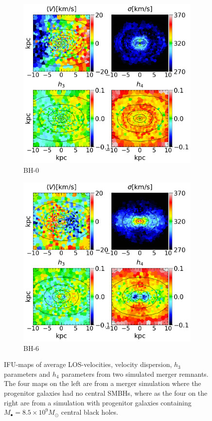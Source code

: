 \documentclass[english, oneside]{HYgradu}
\begin{document}
\begin{figure}
	\centering
	\begin{subfigure}[b]{0.49\textwidth}
		\includegraphics[width=\textwidth]{BH_0.png}
		\caption{BH-0}
	\end{subfigure}
	\begin{subfigure}[b]{0.49\textwidth}
		\includegraphics[width=\textwidth]{BH_6.png}
		\caption{BH-6}
	\end{subfigure}
	\caption{IFU-maps of average LOS-velocities, velocity dispersion, $h_3$ parameters and $h_4$ parameters from two simulated merger remnants. The four maps on the left are from a merger simulation where the progenitor galaxies had no central SMBHs, where as the four on the right are from a simulation with progenitor galaxies containing $M_\bullet = 8.5 \times 10^9 M_\odot$ central black holes.}
\end{figure}
\end{document}
